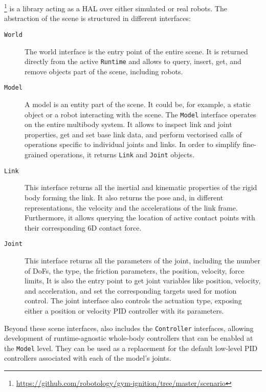 \scenario\footnote{\url{https://github.com/robotology/gym-ignition/tree/master/scenario}} is a \cpp library acting as a \ac{HAL} over either simulated or real robots.
The abstraction of the scene is structured in different interfaces:
%
\begin{description}
%
\item[\texttt{\MakeUppercase{W}orld}]
The world interface is the entry point of the entire scene.
It is returned directly from the active \verb|Runtime| and allows to query, insert, get, and remove objects part of the scene, including robots.
%
\item[\texttt{\MakeUppercase{M}odel}]
A model is an entity part of the scene.
It could be, for example, a static object or a robot interacting with the scene.
The \verb|Model| interface operates on the entire multibody system.
It allows to inspect link and joint properties, get and set base link data, and perform vectorised calls of operations specific to individual joints and links.
In order to simplify fine-grained operations, it returns \verb|Link| and \verb|Joint| objects.
%
\item[\texttt{\MakeUppercase{L}ink}]
This interface returns all the inertial and kinematic properties of the rigid body forming the link.
It also returns the pose and, in different representations, the velocity and the accelerations of the link frame.
Furthermore, it allows querying the location of active contact points with their corresponding 6D contact force.
%
\item[\texttt{\MakeUppercase{J}oint}]
This interface returns all the parameters of the joint, including the number of \acp{DoF}, the type, the friction parameters, the position, velocity, force limits, \etc It is also the entry point to get joint variables like position, velocity, and acceleration, and set the corresponding targets used for motion control.
The joint interface also controls the actuation type, exposing either a position or velocity PID controller with its parameters.
%
\end{description}

Beyond these scene interfaces, \scenario also includes the \verb|Controller| interfaces, allowing development of runtime-agnostic whole-body controllers that can be enabled at the \verb|Model| level.
They can be used as a replacement for the default low-level PID controllers associated with each of the model's joints.

